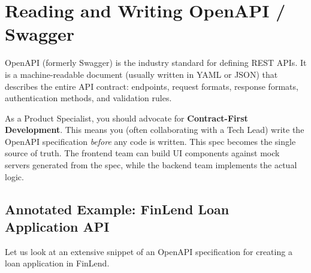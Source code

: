 \section{Reading and Writing OpenAPI /
Swagger}\label{reading-and-writing-openapi-swagger}

OpenAPI (formerly Swagger) is the industry standard for defining REST
APIs. It is a machine-readable document (usually written in YAML or
JSON) that describes the entire API contract: endpoints, request
formats, response formats, authentication methods, and validation rules.

As a Product Specialist, you should advocate for \textbf{Contract-First
Development}. This means you (often collaborating with a Tech Lead)
write the OpenAPI specification \emph{before} any code is written. This
spec becomes the single source of truth. The frontend team can build UI
components against mock servers generated from the spec, while the
backend team implements the actual logic.

\subsection{Annotated Example: FinLend Loan Application
API}\label{annotated-example-finlend-loan-application-api}

Let us look at an extensive snippet of an OpenAPI specification for
creating a loan application in FinLend.


